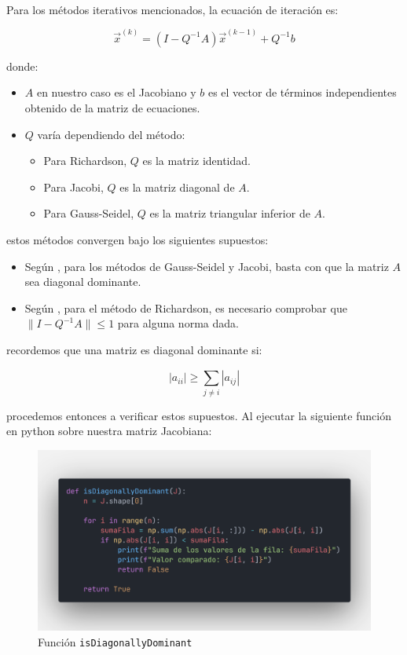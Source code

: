 \documentclass{article}
\begin{document}
  \paragraph{}
  Para los métodos iterativos mencionados, la ecuación de iteración es:

  \[
  \vec{x}^{(k)}=(I-Q^{-1}A)\vec{x}^{(k-1)}+Q^{-1}b
  \]

  donde:
  \begin{itemize}
      \item $A$ en nuestro caso es el Jacobiano y $b$ es el vector de términos independientes obtenido de la matriz de ecuaciones.
      \item $Q$ varía dependiendo del método:
      \begin{itemize}
          \item Para Richardson, $Q$ es la matriz identidad.
          \item Para Jacobi, $Q$ es la matriz diagonal de $A$.
          \item Para Gauss-Seidel, $Q$ es la matriz triangular inferior de $A$.
      \end{itemize}
  \end{itemize}

  estos métodos convergen bajo los siguientes supuestos:
  \begin{itemize}
    \item Según \cite{kincaid}, para los métodos de Gauss-Seidel y Jacobi, basta con que la matriz $A$ sea diagonal dominante.
    \item Según \cite{kincaid}, para el método de Richardson, es necesario comprobar que $\|I-Q^{-1}A\| \leq 1$ para alguna norma dada.
  \end{itemize}

  recordemos que una matriz es diagonal dominante si:

  \[
  |a_{ii}| \geq \sum_{j \neq i}^{} |a_{ij}|
  \]

  procedemos entonces a verificar estos supuestos. Al ejecutar la siguiente función en python sobre nuestra matriz Jacobiana:

  \begin{figure}[H]
      \centering
      \includegraphics[width=1\textwidth]{DiagDom.png}
      \caption{Función \texttt{isDiagonallyDominant}}
  \end{figure}
\end{document}

